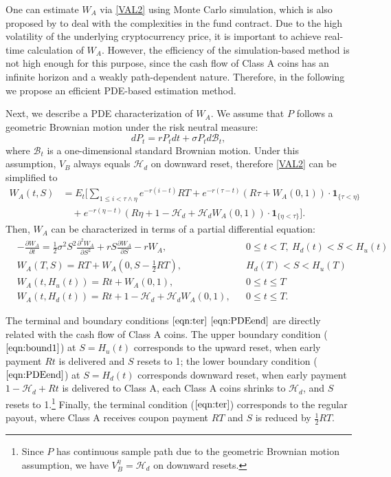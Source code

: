 \documentclass[draft, noinfoline]{ectaart}
\numberwithin{equation}{section}
\theoremstyle{plain}
\begin{document}
One can estimate $W_A$ via \eqref{VAL2} using Monte Carlo simulation, which is also proposed by \cite{adams_risk_2006} to deal with the complexities in the fund contract. Due to the high volatility of the underlying cryptocurrency price, it is important to achieve real-time calculation of $W_A$. However, the efficiency of the simulation-based method is not high enough for this purpose, since the cash flow of Class A coins has an infinite horizon and a weakly path-dependent nature. Therefore, in the following we propose an efficient PDE-based estimation method.

Next, we describe a PDE characterization of $W_A$. We assume that $P$ follows a geometric Brownian motion under the risk neutral measure:
$$
dP_{t}=r P_tdt+\sigma P_{t}d\mathcal{B}_{t},
$$
where $\mathcal{B}_{t}$ is a one-dimensional standard Brownian motion. Under this assumption, $V_B$ always equals $\mathcal{H}_d$ on downward reset, therefore \eqref{VAL2} can be simplified to
\begin{align} \label{srep0}
W_{A}(t,S) & =E_{t}\Bigg[\sum_{1\le i<\tau\land\eta}e^{-r(i-t)}RT+e^{-r(\tau-t)}(R\tau+W_{A}(0,1))\cdot\mathbf{1}_{\{\tau<\eta\}}\\
 & \quad+e^{-r(\eta-t)}(R\eta+1-\mathcal{H}_d+\mathcal{H}_d W_{A}(0,1))\cdot\mathbf{1}_{\{\eta<\tau\}}\Bigg]. \nonumber
\end{align}
Then, $W_{A}$ can be characterized in terms of a partial differential equation:
\begin{align}\label{eqn:PDEstart}
&-\frac{\partial W_{A}}{\partial t} =\frac{1}{2}\sigma^{2}S^{2}\frac{\partial^{2}W_{A}}{\partial S^{2}}+r S\frac{\partial W_{A}}{\partial S}-r W_{A}, &&0\le t<T,~H_d(t)<S<H_u(t)\\\label{eqn:ter}
&W_{A}(T,S)  =RT+W_{A}(0,S-\frac{1}{2}RT),&&H_d(T)<S<H_u(T)\\\label{eqn:bound1}
&W_{A}(t,H_{u}(t))  =Rt+W_{A}(0,1),&&0\le t\le T\\\label{eqn:PDEend}
&W_{A}(t,H_d(t))  =Rt+1-\mathcal{H}_{d}+\mathcal{H}_{d}W_{A}(0,1),&&0\le t\le T.
\end{align}

The terminal and boundary conditions $\eqref{eqn:ter}$ \textendash{} $\eqref{eqn:PDEend}$ are directly related with the cash flow of Class A coins. The upper boundary condition ($\ref{eqn:bound1}$) at $S=H_{u}(t)$ corresponds to the upward reset, when early payment $Rt$ is delivered and $S$ resets to 1; the lower boundary condition ($\ref{eqn:PDEend}$) at $S=H_d(t)$ corresponds downward reset, when early payment $1-\mathcal{H}_d+Rt$ is delivered to Class A, each Class A coins shrinks to $\mathcal{H}_{d}$, and $S$ resets to 1.\footnote{Since $P$ has continuous sample path due to the geometric Brownian motion assumption, we have $V_B^{\eta}=\mathcal{H}_d$ on downward resets.} Finally, the terminal condition ($\ref{eqn:ter}$) corresponds to the regular payout, where Class A receives coupon payment $RT$ and $S$ is reduced by $\frac{1}{2}RT$.
\end{document}
